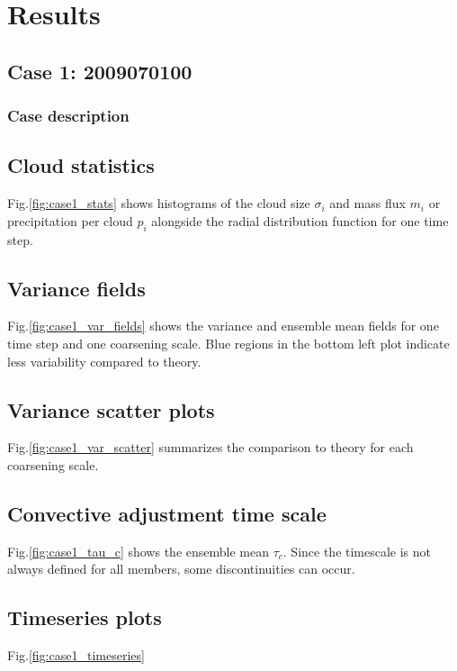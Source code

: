 \documentclass[a4paper, 12pt, draft]{article}
\begin{document}
\section{Results}

\subsection{Case 1: 2009070100}
\subsubsection{Case description}

\subsection{Cloud statistics}
Fig.\ref{fig:case1_stats} shows histograms of the cloud size $\sigma_i$ and mass flux $m_i$ or precipitation per cloud $p_i$ alongside the radial distribution function for one time step. 

\subsection{Variance fields}
Fig.\ref{fig:case1_var_fields} shows the variance and ensemble mean fields for one time step and one coarsening scale. Blue regions in the bottom left plot indicate less variability compared to theory.

\subsection{Variance scatter plots}
Fig.\ref{fig:case1_var_scatter} summarizes the comparison to theory for each coarsening scale.

\subsection{Convective adjustment time scale}
Fig.\ref{fig:case1_tau_c} shows the ensemble mean $\tau_c$. Since the timescale is not always defined for all members, some discontinuities can occur. 

\subsection{Timeseries plots}
Fig.\ref{fig:case1_timeseries}




\newpage

{\small
 }
\end{document}
